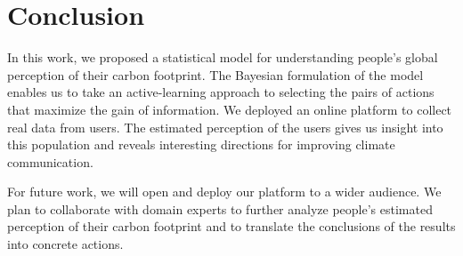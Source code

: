 \section{Conclusion}
\label{sec:conclusion}

In this work, we proposed a statistical model for understanding people's global perception of their carbon footprint.
The Bayesian formulation of the model enables us to take an active-learning approach to selecting the pairs of actions that maximize the gain of information.
We deployed an online platform to collect real data from users.
The estimated perception of the users gives us insight into this population and reveals interesting directions for improving climate communication.

For future work, we will open and deploy our platform to a wider audience.
We plan to collaborate with domain experts to further analyze people's estimated perception of their carbon footprint and to translate the conclusions of the results into concrete actions.
